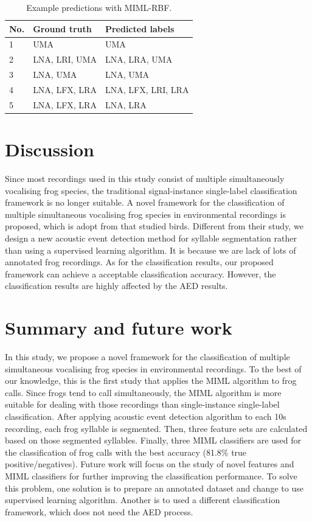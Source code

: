 \begin{table}[htb!]
\centering
\caption{Example predictions with MIML-RBF.}
\label{tab:prediction}
\begin{tabular}{lll}
\hline\hline
{\bf No.} &{\bf Ground truth} & {\bf Predicted labels} \\ \hline
1&UMA                & UMA                    \\ 
2&LNA, LRI, UMA      & LNA, LRA, UMA          \\ 
3&LNA, UMA           & LNA, UMA               \\ 
4&LNA, LFX, LRA      & LNA, LFX, LRI, LRA     \\ 
5&LNA, LFX, LRA      & LNA, LRA               \\ \hline\hline
\end{tabular}
\end{table}



\section{Discussion}
Since most recordings used in this study consist of multiple simultaneously vocalising frog species, the traditional signal-instance single-label classification framework is no longer suitable. A novel framework for the classification of multiple simultaneous vocalising frog species in environmental recordings is proposed, which is adopt from \cite{briggs2012acoustic} that studied birds. Different from their study, we design a new acoustic event detection method for syllable segmentation rather than using a supervised learning algorithm. It is because we are lack of lots of annotated frog recordings. As for the classification results, our proposed framework can achieve a acceptable classification accuracy. However, the classification results are highly affected by the AED results. 


\section{Summary and future work}
In this study, we propose a novel framework for the classification of multiple simultaneous vocalising frog species in environmental recordings. To the best of our knowledge, this is the first study that applies the MIML algorithm to frog calls. Since frogs tend to call simultaneously, the MIML algorithm is more suitable for dealing with those recordings than single-instance single-label classification. After applying acoustic event detection algorithm to each 10s recording, each frog syllable is segmented. Then, three feature sets are calculated based on those segmented syllables. Finally, three MIML classifiers are used for the classification of frog calls with the best accuracy (81.8\% true positive/negatives). Future work will focus on the study of novel features and MIML classifiers for further improving the classification performance. To solve this problem, one solution is to prepare an annotated dataset and change to use supervised learning algorithm. Another is to used a different classification framework, which does not need the AED process.  


